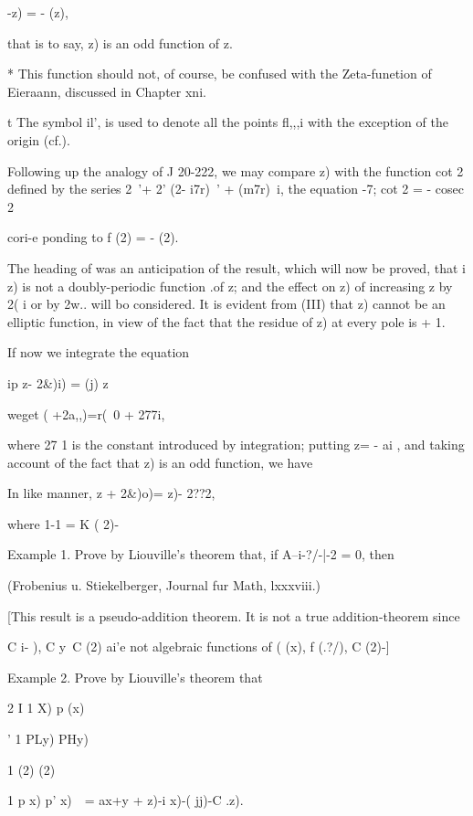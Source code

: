 {  -z) = - (z),

that is to say, z) is an odd function of z.

* This function should not, of course, be confused with the
Zeta-funetion of Eieraann, discussed in Chapter xni.

t The symbol il', is used to denote all the points fl,,,i with the
exception of the origin (cf.).

%
%

Following up the analogy of J 20-222, we may compare z) with the
function cot 2 defined by the series 2~'+ 2' (2- i7r)~' + (m7r)~i,
the equation -7; cot 2 = - cosec 2

cori-e ponding to f (2) = - (2).


The heading of was an anticipation of the result, which will
now be proved, that i z) is not a doubly-periodic function .of z; and
the effect on z) of increasing z by 2( i or by 2w.. will bo
considered. It is evident from (III) that z) cannot be an
elliptic function, in view of the fact that the residue of z) at every
pole is + 1.

If now we integrate the equation

ip z- 2\&)i) = (j) z\

weget ( +2a,,)=r(~0 + 277i,

where 27 1 is the constant introduced by integration; putting z= - ai
, and taking account of the fact that z) is an odd function, we have

In like manner, z + 2\&)o)= z)- 2??2,

where 1-1 = K ( 2)-

Example 1. Prove by Liouville's theorem that, if A--i-?/-|-2 = 0, then

(Frobenius u. Stiekelberger, Journal fur Math, lxxxviii.)

[This result is a pseudo-addition theorem. It is not a true
addition-theorem since

C i- ), C y\ C (2) ai'e not algebraic functions of ( (x), f (.?/), C
(2)-]

Example 2. Prove by Liouville's theorem that

2 I 1 X) p (x)

' 1 PLy) PHy)

1 (2) (2)

1 p x) p' x)\ \ = ax+y + z)-i x)-( jj)-C .z).

}
